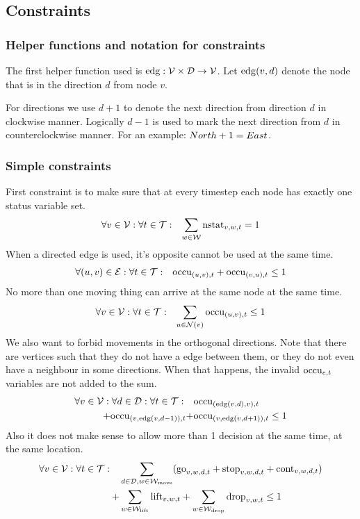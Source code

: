\subsection{Constraints}
\subsubsection{Helper functions and notation for constraints}
\label{sec:helpers}
The first helper function used is $\mathrm{edg} : \mathcal{V} \times \mathcal{D} \to \mathcal{V}$. Let $\mathrm{edg}(v,d)$
denote the node that is in the direction $d$ from node $v$.

For directions we use $d + 1$ to denote the next direction from direction $d$ in
clockwise manner. Logically $d - 1$ is used to mark the next direction from $d$
in counterclockwise manner. For an example: $North + 1 = East$.
\subsubsection{Simple constraints}
First constraint is to make sure that at every timestep each node has exactly
one status variable set.
\begin{align}
    &\forall v \in \mathcal{V}: \forall t \in \mathcal{T}: & \sum_{w \in \mathcal{W}} \mathrm{nstat}_{v,w,t} = 1
\end{align}
When a directed edge is used, it's opposite cannot be used at the same time.
\begin{align}
    &\forall (u,v) \in \mathcal{E}: \forall t \in \mathcal{T}: & \mathrm{occu}_{(u,v),t} + \mathrm{occu}_{(v,u),t}
    \leq 1
\end{align}
No more than one moving thing can arrive at the same node at the same time.
\begin{align}
    &\forall v \in \mathcal{V}: \forall t \in \mathcal{T}: & \sum_{u \in \mathcal{N}(v)} \mathrm{occu}_{(u,v),t} \leq 1
\end{align}
We also want to forbid movements in the orthogonal directions.  Note that there
are vertices such that they do not have a edge between them, or they do
not even have a neighbour in some directions. When that happens, the invalid
$\mathrm{occu}_{e,t}$ variables are not added to the sum.
\begin{equation}
    \begin{split}
        \forall v \in \mathcal{V}: \forall d \in \mathcal{D}: \forall t \in \mathcal{T}: \quad &
        \mathrm{occu}_{(\mathrm{edg}(v,d),v),t} \\ + \mathrm{occu}_{(v,\mathrm{edg}(v,d-1)),t} + &
        \mathrm{occu}_{(v,\mathrm{edg}(v,d+1)),t} \leq 1
    \end{split}
\end{equation}
Also it does not make sense to allow more than 1 decision at the same time, at
the same location.
\begin{equation}
    \begin{split}
        \forall v \in \mathcal{V}: \forall t \in \mathcal{T}: \quad & \sum_{d \in \mathcal{D}, w \in
        \mathcal{W}_\mathrm{move}}(\mathrm{go}_{v,w,d,t} + \mathrm{stop}_{v,w,d,t} + \mathrm{cont}_{v,w,d,t}) \\
        + & \sum_{w \in \mathcal{W}_\mathrm{lift}} \mathrm{lift}_{v,w,t} + \sum_{w \in \mathcal{W}_\mathrm{drop}} \mathrm{drop}_{v,w,t}
        \leq 1
    \end{split}
\end{equation}


